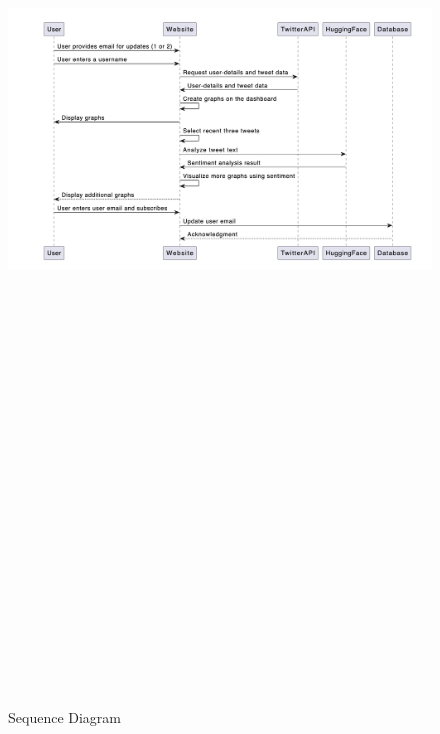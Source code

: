 \documentclass[a4paper,12pt]{article}
\begin{document}
{{{		\begin{figure}[htbp]
			\centering
			\includegraphics[width=6in, height=15in, keepaspectratio]{sequenceDiagram.png}
			\label{sequencediagram}
			\caption{Sequence Diagram}
		\end{figure}

}}}
\end{document}
